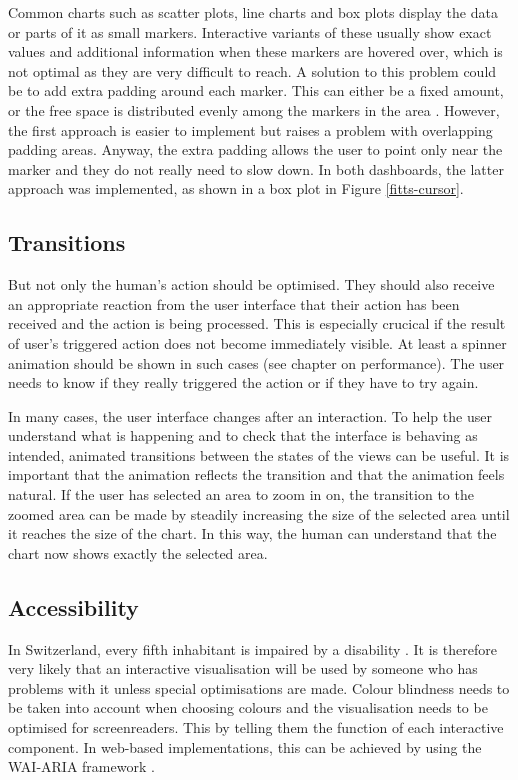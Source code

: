 \documentclass[11pt]{article}
\begin{document}
Common charts such as scatter plots, line charts and box plots display the data or parts of it as small markers. Interactive variants of these usually show exact values and additional information when these markers are hovered over, which is not optimal as they are very difficult to reach. A solution to this problem could be to add extra padding around each marker. This can either be a fixed amount, or the free space is distributed evenly among the markers in the area \parencite{mccrocklin_interaction_2015}. However, the first approach is easier to implement but raises a problem with overlapping padding areas. Anyway, the extra padding allows the user to point only near the marker and they do not really need to slow down. In both dashboards, the latter approach was implemented, as shown in a box plot in Figure \ref{fitts-cursor}.

\subsection{Transitions}

But not only the human's action should be optimised. They should also receive an appropriate reaction from the user interface that their action has been received and the action is being processed. This is especially crucical if the result of user's triggered action does not become immediately visible. At least a spinner animation should be shown in such cases (see chapter on performance). The user needs to know if they really triggered the action or if they have to try again.

In many cases, the user interface changes after an interaction. To help the user understand what is happening and to check that the interface is behaving as intended, animated transitions between the states of the views can be useful. It is important that the animation reflects the transition and that the animation feels natural. If the user has selected an area to zoom in on, the transition to the zoomed area can be made by steadily increasing the size of the selected area until it reaches the size of the chart. In this way, the human can understand that the chart now shows exactly the selected area.

\subsection{Accessibility}

In Switzerland, every fifth inhabitant is impaired by a disability \parencite{federal_statistical_office_persons_2019}. It is therefore very likely that an interactive visualisation will be used by someone who has problems with it unless special optimisations are made. Colour blindness needs to be taken into account when choosing colours and the visualisation needs to be optimised for screenreaders. This by telling them the function of each interactive component. In web-based implementations, this can be achieved by using the WAI-ARIA framework \parencite{nurthen_wai-aria_2022}.
\end{document}
